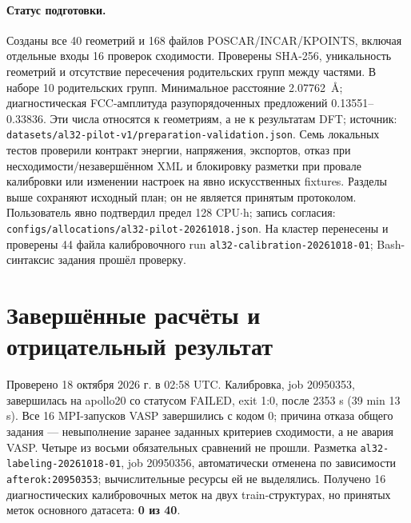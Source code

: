 \documentclass[11pt,a4paper]{article}
\begin{document}
\paragraph{Статус подготовки.} Созданы все 40 геометрий и 168 файлов
POSCAR/INCAR/KPOINTS, включая отдельные входы 16 проверок сходимости.
Проверены SHA-256, уникальность геометрий и отсутствие пересечения
родительских групп между частями. В наборе 10 родительских групп.
Минимальное расстояние 2.07762~\AA; диагностическая FCC-амплитуда
разупорядоченных предложений 0.13551--0.33836.
Эти числа относятся к геометриям, а не к результатам DFT;
источник: \texttt{datasets/al32-pilot-v1/preparation-validation.json}.
Семь локальных тестов проверили контракт энергии, напряжения, экспортов,
отказ при несходимости/незавершённом XML и блокировку разметки при провале
калибровки или изменении настроек на явно искусственных fixtures.
Разделы выше сохраняют исходный план; он не является принятым протоколом.
Пользователь явно подтвердил предел 128 CPU$\cdot$h; запись согласия:
\texttt{configs/allocations/al32-pilot-20261018.json}.
На кластер перенесены и проверены 44 файла калибровочного run
\texttt{al32-calibration-20261018-01}; Bash-синтаксис задания прошёл проверку.
\section{Завершённые расчёты и отрицательный результат}
Проверено 18 октября 2026 г. в 02:58 UTC. Калибровка, job 20950353,
завершилась на apollo20 со статусом FAILED, exit 1:0, после 2353 s
(39 min 13 s). Все 16 MPI-запусков VASP завершились с кодом 0;
причина отказа общего задания --- невыполнение заранее заданных критериев
сходимости, а не авария VASP. Четыре из восьми обязательных сравнений не прошли.
Разметка \texttt{al32-labeling-20261018-01}, job 20950356, автоматически
отменена по зависимости \texttt{afterok:20950353}; вычислительные ресурсы
ей не выделялись. Получено 16 диагностических калибровочных меток на двух
train-структурах, но принятых меток основного датасета: \textbf{0 из 40}.
\end{document}
